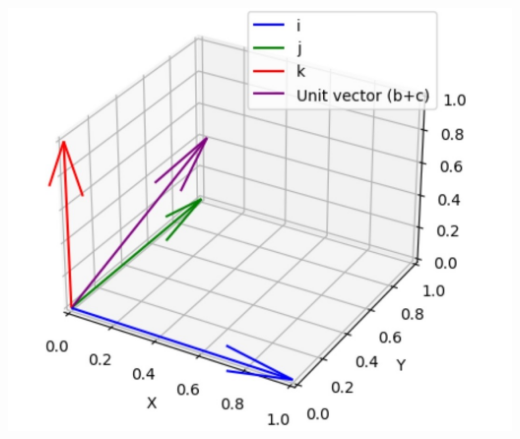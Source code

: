 \documentclass[12pt]{article}
\begin{document}
\begin{enumerate}
\begin{center}
\includegraphics[width=\columnwidth]{figs/unitvector}
\end{center}
\end{enumerate}
\end{document}
